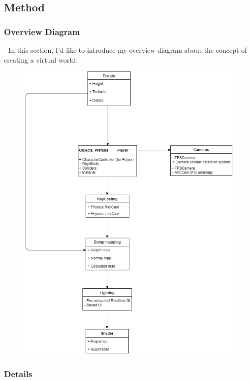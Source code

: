 \documentclass[a4paper, 13pt]{extarticle}
\begin{document}
 		 \subsection{Method}  
 		 \subsubsection{Overview Diagram}
 		 - In this section, I'd like to introduce my overview diagram about the concept of creating a virtual world: \par
 		 
 		 	\begin{figure}[h]
 		 		\centering
 		 		\includegraphics[width=0.59\columnwidth]{Overview_diagram.png}
 		 		\label{fig:Overview1}
 		 	\end{figure}
 		 
 		 
 		 \newpage
 		  \subsubsection{Details}
\end{document}
